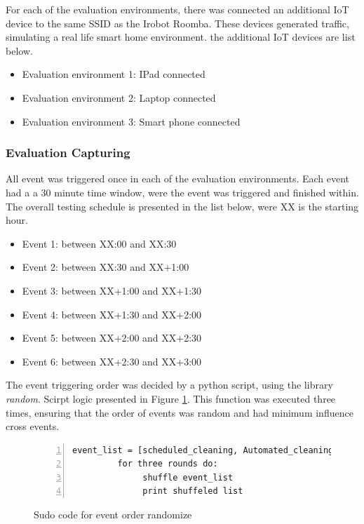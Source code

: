 For each of the evaluation environments, there was connected an additional IoT device to the same SSID as the Irobot Roomba. These devices generated traffic, simulating a real life smart home environment. the additional IoT devices are list below.

\begin{itemize}
    \item Evaluation environment 1: IPad connected
    \item Evaluation environment 2: Laptop connected
    \item Evaluation environment 3: Smart phone connected
\end{itemize}

\subsubsection{Evaluation Capturing}

All event was triggered once in each of the evaluation environments. Each event had a a 30 minute time window, were the event was triggered and finished within. The overall testing schedule is presented in the list below, were XX is the starting hour. 

\begin{itemize}
    \item Event 1: between XX:00 and XX:30
    \item Event 2: between XX:30 and XX+1:00
    \item Event 3: between XX+1:00 and XX+1:30
    \item Event 4: between XX+1:30 and XX+2:00
    \item Event 5: between XX+2:00 and XX+2:30
    \item Event 6: between XX+2:30 and XX+3:00
\end{itemize}

The event triggering order was decided by a python script, using the library \textit{random}. Scirpt logic presented in Figure \ref{fig:Sudo_code_for_event_order_randomize}. This function was executed three times, ensuring that the order of events was random and had minimum influence cross events.

\begin{figure}[H]
    \centering
    \caption{Sudo code for event order randomize}
    \label{fig:Sudo_code_for_event_order_randomize}
    \begin{lstlisting}[numbers=left]
         event_list = [scheduled_cleaning, Automated_cleaning, Application_triggered_cleaning, Application_start, Physical_triggered_cleaning, Bin_remove]
         for three rounds do:
              shuffle event_list
              print shuffeled list
    \end{lstlisting}
\end{figure}

